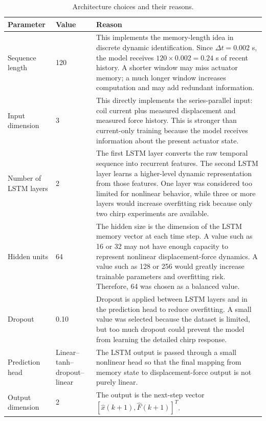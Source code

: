 \documentclass[11pt]{article}
\begin{document}
\begin{table}[H]
\centering
\small
\begin{tabular}{llp{8cm}}
\toprule
Parameter & Value & Reason \\
\midrule
Sequence length & 120 & This implements the memory-length idea in discrete dynamic identification. Since $\Delta t=0.002$ s, the model receives $120\times0.002=0.24$ s of recent history. A shorter window may miss actuator memory; a much longer window increases computation and may add redundant information. \\
Input dimension & 3 & This directly implements the series-parallel input: coil current plus measured displacement and measured force history. This is stronger than current-only training because the model receives information about the present actuator state. \\
Number of LSTM layers & 2 & The first LSTM layer converts the raw temporal sequence into recurrent features. The second LSTM layer learns a higher-level dynamic representation from those features. One layer was considered too limited for nonlinear behavior, while three or more layers would increase overfitting risk because only two chirp experiments are available. \\
Hidden units & 64 & The hidden size is the dimension of the LSTM memory vector at each time step. A value such as 16 or 32 may not have enough capacity to represent nonlinear displacement-force dynamics. A value such as 128 or 256 would greatly increase trainable parameters and overfitting risk. Therefore, 64 was chosen as a balanced value. \\
Dropout & 0.10 & Dropout is applied between LSTM layers and in the prediction head to reduce overfitting. A small value was selected because the dataset is limited, but too much dropout could prevent the model from learning the detailed chirp response. \\
Prediction head & Linear--tanh--dropout--linear & The LSTM output is passed through a small nonlinear head so that the final mapping from memory state to displacement-force output is not purely linear. \\
Output dimension & 2 & The output is the next-step vector $[\hat{x}(k+1),\hat{F}(k+1)]^T$. \\
\bottomrule
\end{tabular}
\caption{Architecture choices and their reasons.}
\label{tab:architecture_choices}
\end{table}
\end{document}

